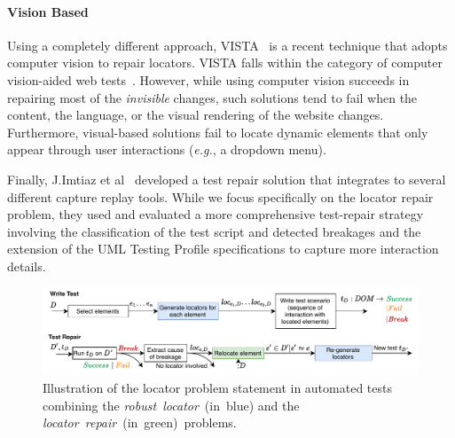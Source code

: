 \paragraph{Vision Based}
Using a completely different approach, VISTA~\cite{stocco2018visual} is a recent technique that adopts computer vision to repair locators. VISTA falls within the category of computer vision-aided web tests~\cite{chang2010gui,leotta2018pesto,alegroth2013jautomate}.
However, while using computer vision succeeds in repairing most of the \textit{invisible} changes, such solutions tend to fail when the content, the language, or the visual rendering of the website changes.
Furthermore, visual-based solutions fail to locate dynamic elements that only appear through user interactions (\emph{e.g.}, a dropdown menu).

Finally, J.Imtiaz et al~\cite{imtiaz2021automated} developed a test repair
solution that integrates to several different capture replay tools. While we
focus specifically on the locator repair problem, they used and evaluated a more
comprehensive test-repair strategy involving the classification of the test script and
detected breakages and the extension of the UML Testing Profile specifications to
capture more interaction details.


\begin{figure}
    \centering
    \includegraphics[width=1\linewidth]{erratum/locator-repair}
    \caption{Illustration of the locator problem statement in automated tests combining the \emph{robust~locator}~(in~blue) and the \emph{locator~repair}~(in~green)~problems.}
    \label{fig:locator_repair}
\end{figure} 

